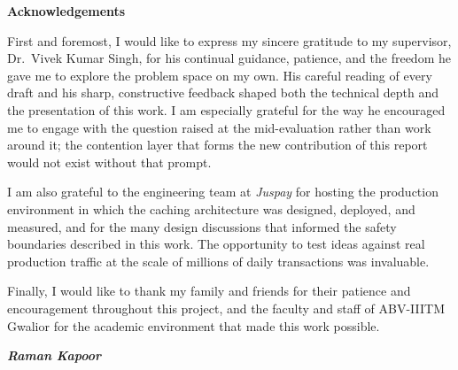 \begin{center}
{\LARGE \bf Acknowledgements}
\end{center}
\noindent
First and foremost, I would like to express my sincere gratitude to my supervisor, Dr.\ Vivek Kumar Singh, for his continual guidance, patience, and the freedom he gave me to explore the problem space on my own. His careful reading of every draft and his sharp, constructive feedback shaped both the technical depth and the presentation of this work. I am especially grateful for the way he encouraged me to engage with the question raised at the mid-evaluation rather than work around it; the contention layer that forms the new contribution of this report would not exist without that prompt.

I am also grateful to the engineering team at \emph{Juspay} for hosting the production environment in which the caching architecture was designed, deployed, and measured, and for the many design discussions that informed the safety boundaries described in this work. The opportunity to test ideas against real production traffic at the scale of millions of daily transactions was invaluable.

Finally, I would like to thank my family and friends for their patience and encouragement throughout this project, and the faculty and staff of ABV-IIITM Gwalior for the academic environment that made this work possible.

\begin{flushright}
\textit{\textbf{Raman Kapoor}}
\end{flushright}
